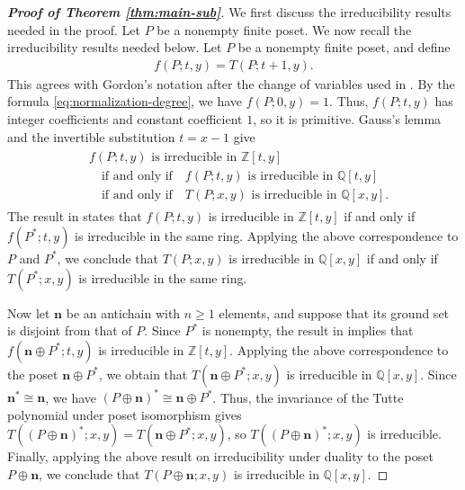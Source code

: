 \documentclass[10pt,a4paper]{amsart}
\begin{document}
\begin{proof}[\rm\textbf{Proof of Theorem \ref{thm:main-sub}}]
We first discuss the irreducibility results needed in the proof.
Let $P$ be a nonempty finite poset.
We now recall the irreducibility results needed below.
Let $P$ be a nonempty finite poset, and define
\begin{eqnarray*}
f(P;t,y)=T(P;t+1,y).
\end{eqnarray*}
This agrees with Gordon's notation after the change of variables used in \cite{Gordon1996}.
By the formula \eqref{eq:normalization-degree}, we have $f(P;0,y)=1$.
Thus, $f(P;t,y)$ has integer coefficients and constant
coefficient $1$, so it is primitive.
Gauss's lemma and the invertible substitution $t=x-1$
give
\begin{eqnarray*}
\begin{aligned}
&f(P;t,y)\text{ is irreducible in }\mathbb Z[t,y]\\
&\quad\text{if and only if}\quad
f(P;t,y)\text{ is irreducible in }\mathbb Q[t,y]\\
&\quad\text{if and only if}\quad
T(P;x,y)\text{ is irreducible in }\mathbb Q[x,y].
\end{aligned}
\end{eqnarray*}
The result in \cite{Gordon1996} states that $f(P;t,y)$
is irreducible in $\mathbb Z[t,y]$ if and only if
$f(P^*;t,y)$ is irreducible in the same ring.
Applying the above correspondence to $P$ and $P^*$,
we conclude that $T(P;x,y)$ is irreducible in $\mathbb Q[x,y]$
if and only if $T(P^*;x,y)$ is irreducible in the same ring.



Now let $\mathbf n$ be an antichain with $n\geq1$ elements,
and suppose that its ground set is disjoint from that of $P$.
Since $P^*$ is nonempty, the result in \cite{Gordon1996}
implies that $f(\mathbf n\oplus P^*;t,y)$
is irreducible in $\mathbb Z[t,y]$.
Applying the above correspondence to the poset
$\mathbf n\oplus P^*$, we obtain that
$T(\mathbf n\oplus P^*;x,y)$
is irreducible in $\mathbb Q[x,y]$.
Since $\mathbf n^*\cong\mathbf n$, we have
$(P\oplus\mathbf n)^*\cong\mathbf n\oplus P^*$.
Thus, the invariance of the Tutte polynomial under poset isomorphism
gives
$T((P\oplus\mathbf n)^*;x,y)=T(\mathbf n\oplus P^*;x,y)$,
so $T((P\oplus\mathbf n)^*;x,y)$ is irreducible.
Finally, applying the above result on irreducibility under duality
to the poset $P\oplus\mathbf n$, we conclude that
$T(P\oplus\mathbf n;x,y)$ is irreducible in $\mathbb Q[x,y]$.


\end{proof}
\end{document}
